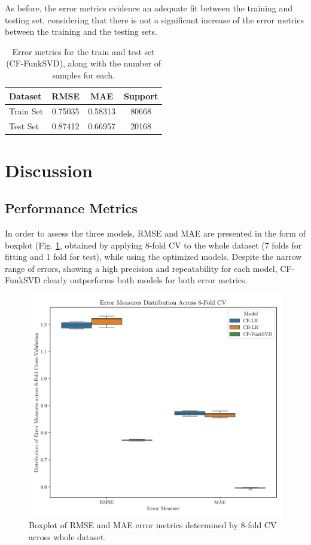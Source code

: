 \documentclass[conference]{IEEEtran}
\begin{document}
As before, the error metrics evidence an adequate fit between the training and testing set, considering that there is not a significant increase of the error metrics between the training and the testing sets.
\newline
\newline
\begin{table}[H]
\centering
\caption{Error metrics for the train and test set (CF-FunkSVD), along with the number of samples for each.}
\label{tab:model03_results}
\begin{tabular}{lccc}
\toprule
\textbf{Dataset} & \textbf{RMSE} & \textbf{MAE} & \textbf{Support} \\
\midrule
Train Set & 0.75035 & 0.58313 & 80668 \\
Test Set & 0.87412 & 0.66957 & 20168 \\
\bottomrule
\end{tabular}
\end{table}


\section{Discussion} 
\subsection{Performance Metrics} %

In order to assess the three models, RMSE and MAE are presented in the form of boxplot (Fig. \ref{fig:results_boxplot}, obtained by applying 8-fold CV to the whole dataset (7 folds for fitting and 1 fold for test), while using the optimized models. Despite the narrow range of errors, showing a high precision and repeatability for each model, CF-FunkSVD clearly outperforms both models for both error metrics.

\begin{figure}[H]
    \centering
    \includegraphics[width=1\linewidth]{assets/results_boxplot.png}
    \caption{Boxplot of RMSE and MAE error metrics determined by 8-fold CV across whole dataset.}
    \label{fig:results_boxplot}
\end{figure}
\end{document}
